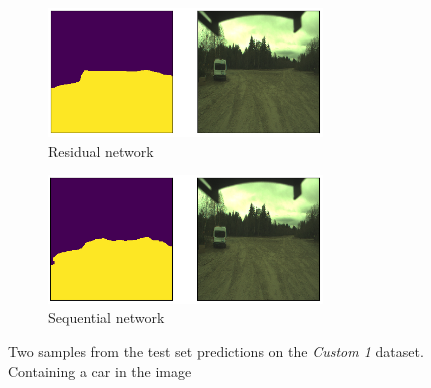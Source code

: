 \documentclass[USenglish]{ifimaster}  %
\begin{document}
\begin{figure}[ht]
\centering
\begin{subfigure}[b]{\textwidth}
\centering
\includegraphics[width=0.8\textwidth]{bilder/custom_1/361_residual.png}
\caption{Residual network}
\label{fig:custom_1_res_poor}
\end{subfigure}
\hfill
\begin{subfigure}[b]{\textwidth}
\centering
\includegraphics[width=0.8\textwidth]{bilder/custom_1/361_sequential.png}
\caption{Sequential network}
\label{fig:custom_1_seq_poor}
\end{subfigure}
\caption{Two samples from the test set predictions on the
\textit{Custom 1} dataset. Containing a car in the image }
\label{fig:custom_1_result_car}
\end{figure}
\end{document}
